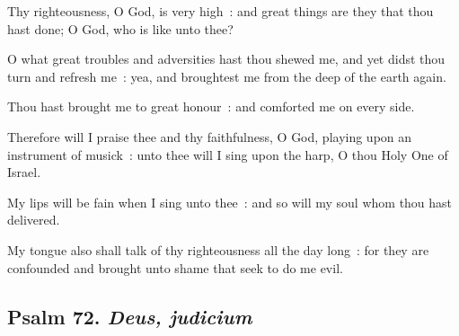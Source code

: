Thy righteousness, O God, is very high~: and great things are they that thou hast done; O God, who is like unto thee?\par
{}O what great troubles and adversities hast thou shewed me, and yet didst thou turn and refresh me~: yea, and broughtest me from the deep of the earth again.\par
{}Thou hast brought me to great honour~: and comforted me on every side.\par
{}Therefore will I praise thee and thy faithfulness, O God, playing upon an instrument of musick~: unto thee will I sing upon the harp, O thou Holy One of Israel.\par
{}My lips will be fain when I sing unto thee~: and so will my soul whom thou hast delivered.\par
{}My tongue also shall talk of thy righteousness all the day long~: for they are confounded and brought unto shame that seek to do me evil.\par

\subsection{Psalm 72. \textit{Deus, judicium}}

